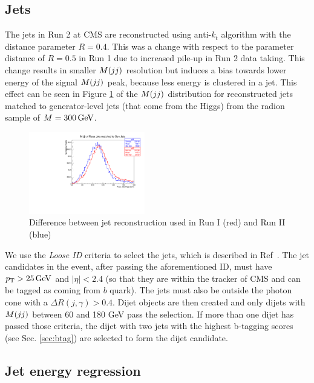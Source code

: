 \subsection{Jets}
\label{sec:jets}

The jets in Run 2 at CMS are reconstructed using anti-$k_t$ algorithm
with the distance parameter $R=0.4$. This was a change with respect to
the parameter distance of $R=0.5$ in Run 1 due to increased pile-up in
Run 2 data taking. This change results in smaller $M(jj)$ resolution
but induces a bias towards lower energy of the signal $M(jj)$ peak,
because less energy is clustered in a jet. This effect can be seen in
Figure \ref{fig:jet-reco} of the $M(jj)$ distribution for reconstructed
jets matched to generator-level jets (that come from the Higgs) from
the radion sample of $M=300\,\text{Ge\hspace{-.08em}V}$.

\begin{figure}[h]
  \centering
  \includegraphics[width=0.45\textwidth]{figures/sec-jets/jet_rec.pdf}
  \caption{Difference between jet reconstruction used in Run I (red) and Run II (blue)}
  \label{fig:jet-reco}
\end{figure}

We use the \textit{Loose ID} criteria to select the jets, which is described in
Ref~\cite{jetID-twiki}. 
The jet candidates in the event, after passing the aforementioned ID,
must have $p_{\mathrm{T}} > 25 \,\text{Ge\hspace{-.08em}V}$ and $|\eta| < 2.4$ (so that they are within
the tracker of CMS and can be tagged as coming from $b$ quark). The
jets must also be outside the photon cone with a $\Delta R(j,\gamma) >
0.4$. Dijet objects are then created and only dijets with $M(jj)$ between 60 and 180 GeV 
pass the selection. If more than one dijet has passed those criteria, the dijet with two jets
with the highest b-tagging scores (see Sec. \ref{sec:btag}) are selected to form
the dijet candidate.


\subsection{Jet energy regression}
\label{sec:b-reg}

